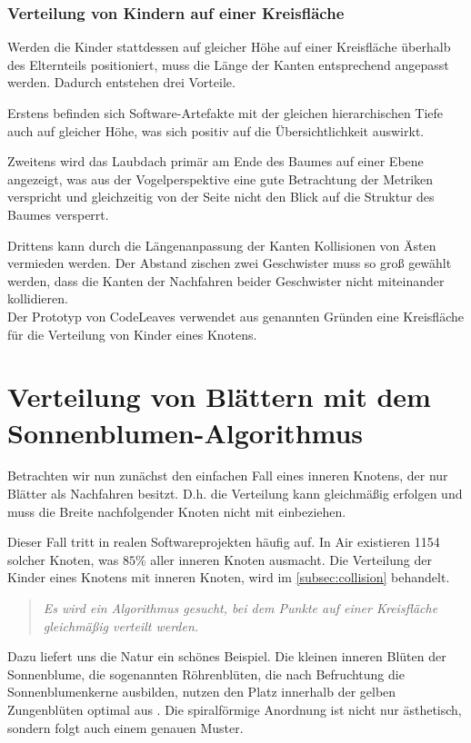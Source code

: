\subsubsection*{Verteilung von Kindern auf einer Kreisfläche}
Werden die Kinder stattdessen auf gleicher Höhe auf einer Kreisfläche überhalb des Elternteils positioniert, muss die Länge der Kanten entsprechend angepasst werden. Dadurch entstehen drei Vorteile.

Erstens befinden sich Software-Artefakte mit der gleichen hierarchischen Tiefe auch auf gleicher Höhe, was sich positiv auf die Übersichtlichkeit auswirkt.

Zweitens wird das Laubdach primär am Ende des Baumes auf einer Ebene angezeigt, was aus der Vogelperspektive eine gute Betrachtung der Metriken verspricht und gleichzeitig von der Seite nicht den Blick auf die Struktur des Baumes versperrt.

Drittens kann durch die Längenanpassung der Kanten Kollisionen von Ästen vermieden werden. Der Abstand zischen zwei Geschwister muss so groß gewählt werden, dass die Kanten der Nachfahren beider Geschwister nicht miteinander kollidieren.\\

Der Prototyp von CodeLeaves verwendet aus genannten Gründen eine Kreisfläche für die Verteilung von Kinder eines Knotens.

\section{Verteilung von Blättern mit dem Sonnenblumen-Algorithmus}
\label{sec:sunflower}

Betrachten wir nun zunächst den einfachen Fall eines inneren Knotens, der nur Blätter als Nachfahren besitzt. D.h. die Verteilung kann gleichmäßig erfolgen und muss die Breite nachfolgender Knoten nicht mit einbeziehen.

Dieser Fall tritt in realen Softwareprojekten häufig auf. In Air existieren 1154 solcher Knoten, was $85\%$ aller inneren Knoten ausmacht. Die Verteilung der Kinder eines Knotens mit inneren Knoten, wird im \ref{subsec:collision} behandelt.

\begin{quote}
  \textit{Es wird ein Algorithmus gesucht, bei dem Punkte auf einer Kreisfläche gleichmäßig verteilt werden.}
\end{quote}

Dazu liefert uns die Natur ein schönes Beispiel. Die kleinen inneren Blüten der Sonnenblume, die sogenannten Röhrenblüten, die nach Befruchtung die Sonnenblumenkerne ausbilden, nutzen den Platz innerhalb der gelben Zungenblüten optimal aus \cite{zimmermann2017sonnenblume}. Die spiralförmige Anordnung ist nicht nur ästhetisch, sondern folgt auch einem genauen Muster.

